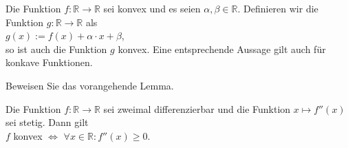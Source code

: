 \begin{Lemma}
  \label{lemma:konvex_invarianz} \lb
  Die Funktion $f:\mathbb{R} \rightarrow \mathbb{R}$ sei konvex und es seien $\alpha, \beta \in \mathbb{R}$.
  Definieren wir die Funktion $g:\mathbb{R} \rightarrow \mathbb{R}$ als
  \\[0.2cm]
  \hspace*{1.3cm}
  $g(x) := f(x) + \alpha \cdot x + \beta$,
  \\[0.2cm]
  so ist auch die Funktion $g$ konvex.  Eine entsprechende Aussage gilt auch f\"ur konkave Funktionen.
\end{Lemma}

\exercise
Beweisen Sie das vorangehende Lemma. \eox
\pagebreak

\vspace*{\fill}
\pagebreak

\begin{Satz}
Die Funktion $f:\mathbb{R} \rightarrow \mathbb{R}$ sei zweimal differenzierbar und die Funktion 
$x \mapsto f''(x)$ sei stetig.  Dann gilt 
\\[0.2cm]
\hspace*{1.3cm}
$f$  konvex \quad $\Leftrightarrow$ \quad $\forall x \in \mathbb{R}: f''(x) \geq 0$.
\end{Satz}

